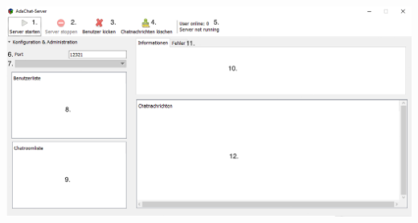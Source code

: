\documentclass[12pt,a4paper,bibliography=totocnumbered,listof=totocnumbered]{scrartcl}
\begin{document}
\begin{minipage}{\linewidth}
	\centering
	\includegraphics[width=1.0\linewidth]{img/Server_GUI.png}

\end{minipage}
\vspace{1em}
\end{document}
